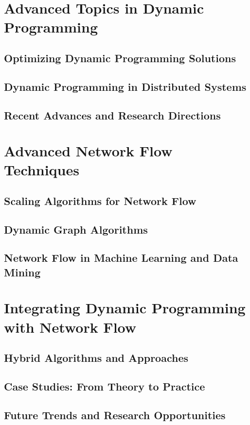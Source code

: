 \documentclass[12pt]{book} %
\begin{document}
\section{Advanced Topics in Dynamic Programming}
\subsection{Optimizing Dynamic Programming Solutions}
\subsection{Dynamic Programming in Distributed Systems}
\subsection{Recent Advances and Research Directions}

\section{Advanced Network Flow Techniques}
\subsection{Scaling Algorithms for Network Flow}
\subsection{Dynamic Graph Algorithms}
\subsection{Network Flow in Machine Learning and Data Mining}

\section{Integrating Dynamic Programming with Network Flow}
\subsection{Hybrid Algorithms and Approaches}
\subsection{Case Studies: From Theory to Practice}
\subsection{Future Trends and Research Opportunities}
\end{document}
